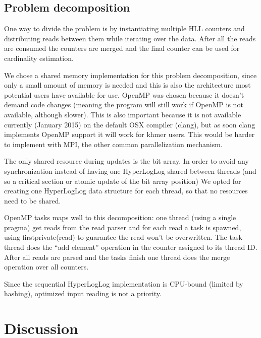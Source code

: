 \documentclass{bioinfo}
\begin{document}
\subsection{Problem decomposition}

One way to divide the problem is by instantiating multiple HLL counters
and distributing reads between them while iterating over the data.
After all the reads are consumed the counters are merged and the final
counter can be used for cardinality estimation.

We chose a shared memory implementation for this problem
decomposition, since only a small amount of memory is needed and this
is also the architecture most potential users have available for use.
OpenMP was chosen because it doesn't demand code changes (meaning the
program will still work if OpenMP is not available, although slower).
This is also important because it is not available currently (January
2015) on the default OSX compiler (clang), but as soon clang
implements OpenMP support it will work for khmer users.  This would be
harder to implement with MPI, the other common parallelization
mechanism.

The only shared resource during updates is the bit array.  In order to
avoid any synchronization instead of having one HyperLogLog shared
between threads (and so a critical section or atomic update of the bit
array position) We opted for creating one HyperLogLog data structure
for each thread, so that no resources need to be shared.

OpenMP tasks maps well to this decomposition: one thread (using a
single pragma) get reads from the read parser and for each read a task
is spawned, using firstprivate(read) to guarantee the read won't be
overwritten.  The task thread does the ``add element'' operation in
the counter assigned to its thread ID.  After all reads are parsed and
the tasks finish one thread does the merge operation over all
counters.

Since the sequential HyperLogLog implementation is CPU-bound (limited by hashing),
optimized input reading is not a priority.

\section{Discussion}

%
\end{document}
